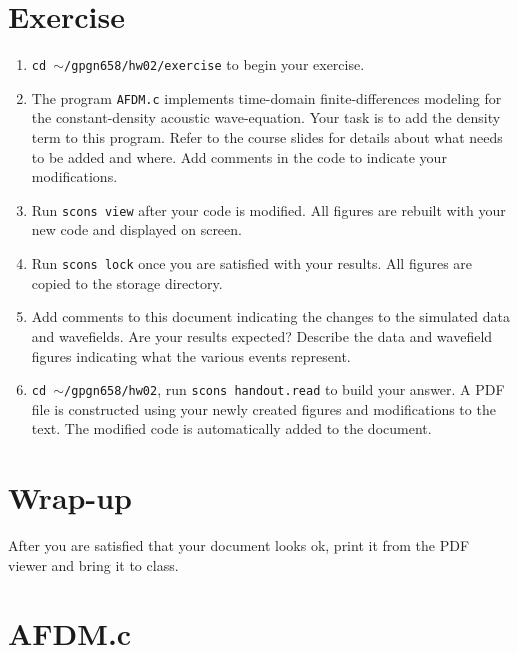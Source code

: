 \section{Exercise}

\begin{enumerate}
\item 
\texttt{cd $\sim$/gpgn658/hw02/exercise} to begin your exercise.

\item 
The program \texttt{AFDM.c} implements time-domain finite-differences
modeling for the constant-density acoustic wave-equation. Your task is
to add the density term to this program. Refer to the course slides
for details about what needs to be added and where. Add comments in
the code to indicate your modifications.

\item 
Run \texttt{scons view} after your code is modified. All figures are
rebuilt with your new code and displayed on screen.

\item 
Run \texttt{scons lock} once you are satisfied with your results. All
figures are copied to the storage directory.

\item 
Add comments to this document indicating the changes to the simulated
data and wavefields. Are your results expected? Describe the data and
wavefield figures indicating what the various events represent.

\item 
\texttt{cd $\sim$/gpgn658/hw02}, run \texttt{scons handout.read} to build 
your answer. A PDF file is constructed using your newly created
figures and modifications to the text. The modified code is
automatically added to the document.

\end{enumerate}

\section{Wrap-up}

After you are satisfied that your document looks ok,
print it from the PDF viewer and bring it to class.

\newpage
\section{AFDM.c}
\tiny

\normalsize


